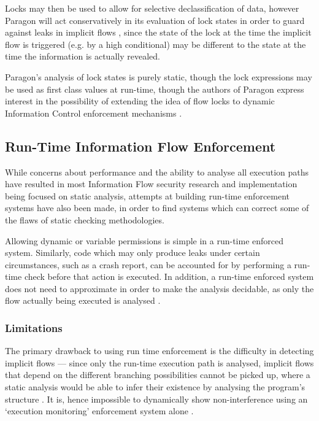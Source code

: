 Locks may then be used to allow for selective declassification of data, however Paragon will act conservatively in its evaluation of lock states in order to guard against leaks in implicit flows \cite{broberg2013paragon}, since the state of the lock at the time the implicit flow is triggered (e.g. by a high conditional) may be different to the state at the time the information is actually revealed.

Paragon's analysis of lock states is purely static, though the lock expressions may be used as first class values at run-time, though the authors of Paragon express interest in the possibility of extending the idea of flow locks to dynamic Information Control enforcement mechanisms \cite{broberg2013paragon}.

\subsection{Run-Time Information Flow Enforcement}

While concerns about performance and the ability to analyse all execution paths have resulted in most Information Flow security research and implementation being focused on static analysis, attempts at building run-time enforcement systems have also been made, in order to find systems which can correct some of the flaws of static checking methodologies.

Allowing dynamic or variable permissions is simple in a run-time enforced system. Similarly, code which may only produce leaks under certain circumstances, such as a crash report, can be accounted for by performing a run-time check before that action is executed. In addition, a run-time enforced system does not need to approximate in order to make the analysis decidable, as only the flow actually being executed is analysed \cite{venkatakrishnan2006runtime}.

\subsubsection{Limitations}

The primary drawback to using run time enforcement is the difficulty in detecting implicit flows \cite{sabelfeld2003if} --- since only the run-time execution path is analysed, implicit flows that depend on the different branching possibilities cannot be picked up, where a static analysis would be able to infer their existence by analysing the program's structure \cite{venkatakrishnan2006runtime}. It is, hence impossible to dynamically show non-interference using an `execution monitoring' enforcement system alone \cite{schneider2000executionmonitoring}.

